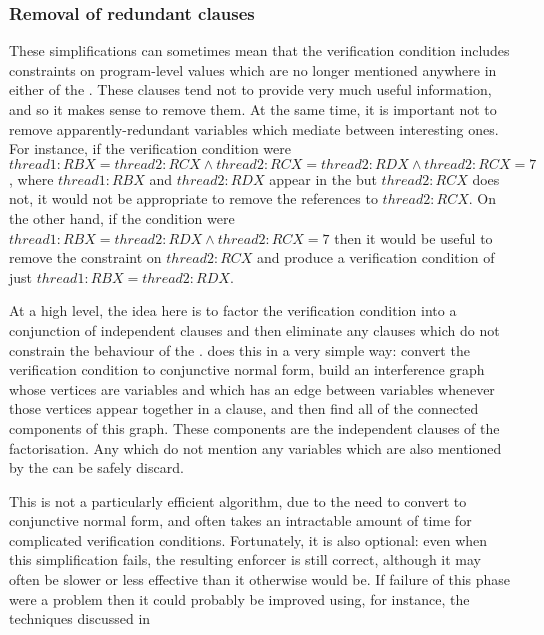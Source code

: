 \subsubsection{Removal of redundant clauses}
These simplifications can sometimes mean that the verification
condition includes constraints on program-level values which are no
longer mentioned anywhere in either of the {\StateMachines}.  These
clauses tend not to provide very much useful information, and so it
makes sense to remove them.  At the same time, it is important not to
remove apparently-redundant variables which mediate between
interesting ones.  For instance, if the verification condition were
$thread1:RBX = thread2:RCX \wedge thread2:RCX = thread2:RDX \wedge
thread2:RCX = 7$, where $thread1:RBX$ and $thread2:RDX$ appear in the
{\StateMachines} but $thread2:RCX$ does not, it would not be
appropriate to remove the references to $thread2:RCX$.  On the other
hand, if the condition were $thread1:RBX = thread2:RDX \wedge
thread2:RCX = 7$ then it would be useful to remove the constraint on
$thread2:RCX$ and produce a verification condition of just
$thread1:RBX = thread2:RDX$.  

At a high level, the idea here is to factor the verification condition
into a conjunction of independent clauses and then eliminate any
clauses which do not constrain the behaviour of the {\StateMachines}.
{\Technique} does this in a very simple way: convert the verification
condition to conjunctive normal form, build an interference graph
whose vertices are variables and which has an edge between variables
whenever those vertices appear together in a clause, and then find all
of the connected components of this graph.  These components are the
independent clauses of the factorisation.  Any which do not mention
any variables which are also mentioned by the {\StateMachines} can be
safely discard. 

This is not a particularly efficient algorithm, due to the need to
convert to conjunctive normal form, and often takes an intractable
amount of time for complicated verification conditions.  Fortunately,
it is also optional: even when this simplification fails, the
resulting enforcer is still  correct, although it
may often be slower or less effective than it otherwise would be.  If
failure of this phase were a problem then it could probably be
improved using, for instance, the techniques discussed in 

